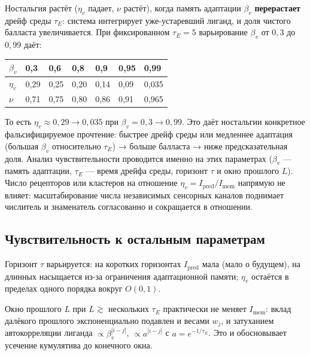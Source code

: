 \documentclass[pdflatex,sn-mathphys-ay]{sn-jnl}
\begin{document}
Ностальгия растёт (\(\eta_v\) падает, \(\nu\) растёт), когда память адаптации \(\beta_v\) \textbf{перерастает} дрейф среды \(\tau_E\): система интегрирует уже-устаревший лиганд, и доля чистого балласта увеличивается. При фиксированном \(\tau_E = 5\) варьирование \(\beta_v\) от \(0{,}3\) до \(0{,}99\) даёт:

\begin{center}\small
\begin{tabular}{@{}lllllll@{}}
\toprule
\(\beta_v\) & 0,3 & 0,6 & 0,8 & 0,9 & 0,95 & 0,99 \\
\midrule
\(\eta_v\) & 0,29 & 0,25 & 0,20 & 0,14 & 0,09 & 0,035 \\
\(\nu\) & 0,71 & 0,75 & 0,80 & 0,86 & 0,91 & 0,965 \\
\bottomrule
\end{tabular}
\end{center}

То есть \(\eta_v \approx 0{,}29 \to 0{,}035\) при \(\beta_v = 0{,}3 \to 0{,}99\). Это даёт ностальгии конкретное фальсифицируемое прочтение: быстрее дрейф среды или медленнее адаптация (большая \(\beta_v\) относительно \(\tau_E\)) → больше балласта → ниже предсказательная доля. Анализ чувствительности проводится именно на этих параметрах (\(\beta_v\) --- память адаптации, \(\tau_E\) --- время дрейфа среды, горизонт \(\tau\) и окно прошлого \(L\)). Число рецепторов или кластеров на отношение \(\eta_v = I_{\text{pred}}/I_{\text{mem}}\) напрямую не влияет: масштабирование числа независимых сенсорных каналов поднимает числитель и знаменатель согласованно и сокращается в отношении.

\subsection*{Чувствительность к остальным параметрам}\label{ux447ux443ux432ux441ux442ux432ux438ux442ux435ux43bux44cux43dux43eux441ux442ux44c-ux43a-ux43eux441ux442ux430ux43bux44cux43dux44bux43c-ux43fux430ux440ux430ux43cux435ux442ux440ux430ux43c}

Горизонт \(\tau\) варьируется: на коротких горизонтах \(I_{\text{pred}}\) мала (мало о будущем), на длинных насыщается из-за ограничения адаптационной памяти; \(\eta_v\) остаётся в пределах одного порядка вокруг \(O(0{,}1)\).

Окно прошлого \(L\) при \(L \gtrsim\) нескольких \(\tau_E\) практически не меняет \(I_{\text{mem}}\): вклад далёкого прошлого экспоненциально подавлен и весами \(w_j\), и затуханием автокорреляции лиганда \(\propto \beta_v^{|i-j|}\), \(\propto a^{|i-j|}\) с \(a = e^{-1/\tau_E}\). Это и обосновывает усечение кумулятива до конечного окна.
\end{document}
